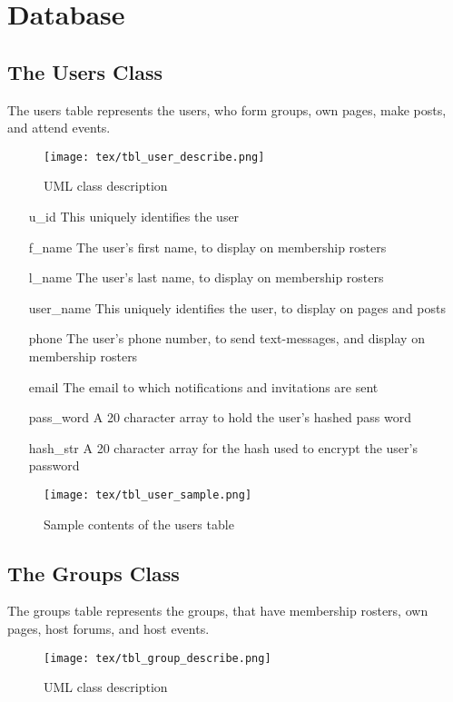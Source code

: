 \documentclass[12pt, twoside, letterpaper]{report}
\begin{document}
\section{Database}

\subsection{The Users Class}
The users table represents the users, who form groups, own
pages, make posts, and attend events.
\begin{wrapfigure}[7]{r}{2.5in}
\begin{center}
\caption{UML class description}
\texttt{[image: tex/tbl\_user\_describe.png]}
\end{center}
\end{wrapfigure}
\begin{itemize}
\item[u\_id] This uniquely identifies the user
\item[f\_name] The user's first name, to display on
     membership rosters
\item[l\_name] The user's last name, to display on
     membership rosters
\item[user\_name] This uniquely identifies the user, to
     display on pages and posts
\item[phone] The user's phone number, to send text-messages,
     and display on membership rosters
\end{itemize}

\begin{itemize}
\item[email] The email to which notifications and
     invitations are sent
\item[pass\_word] A 20 character array to hold the user's
     hashed pass word
\item[hash\_str] A 20 character array for the hash used to
     encrypt the user's password
\end{itemize}
\begin{figure}[h]
\begin{center}
\caption{Sample contents of the users table}
\texttt{[image: tex/tbl\_user\_sample.png]}
\end{center}
\end{figure}
\pagebreak
\subsection{The Groups Class}
The groups table represents the groups, that have
    membership rosters, own pages, host forums, and host
    events.\\
\begin{wrapfigure}[8]{r}{2.5in}
\begin{center}
\caption{UML class description}
\texttt{[image: tex/tbl\_group\_describe.png]}
\end{center}
\end{wrapfigure}
\end{document}
